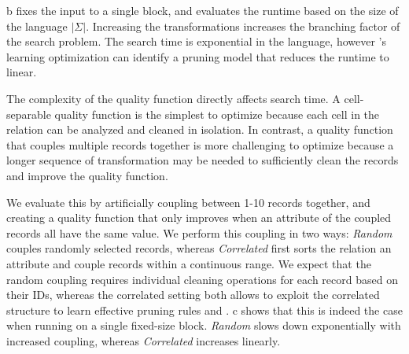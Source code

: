  b fixes the input to a single block, and evaluates the runtime based on the size of the language $|\Sigma|$.  Increasing the transformations increases the branching factor of the search problem. The search time is exponential in the language, however \sys's learning optimization can identify a pruning model that reduces the runtime to linear.

 The complexity of the quality function directly affects search time.  A cell-separable quality function is the simplest to optimize because each cell in the relation can be analyzed and cleaned in isolation.  In contrast, a quality function that couples multiple records together is more challenging to optimize because a longer sequence of transformation may be needed to sufficiently clean the records and improve the quality function.  

We evaluate this by artificially coupling between 1-10 records together, and creating a quality function that only improves when an attribute of the coupled records all have the same value.  We perform this coupling in two ways: {\it Random} couples randomly selected records, whereas {\it Correlated} first sorts the relation an attribute and couple records within a continuous range.  We expect that the random coupling requires individual cleaning operations for each record based on their IDs, whereas the correlated setting both allows \sys to exploit the correlated structure to learn effective pruning rules and .  c shows that this is indeed the case when running \sys on a single fixed-size block. {\it Random} slows down exponentially with increased coupling, whereas {\it Correlated} increases linearly.


